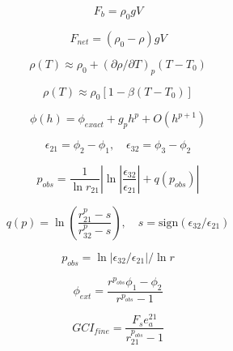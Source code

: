 
\[
F_b=\rho_0 gV
\]

\[
F_{net}=(\rho_0-\rho)gV
\]

\[
\rho(T)\approx\rho_0+(\partial\rho/\partial T)_p(T-T_0)
\]

\[
\rho(T)\approx\rho_0[1-\beta(T-T_0)]
\]

\[
\phi(h)=\phi_{exact}+g_p h^p+O(h^{p+1})
\]

\[
\epsilon_{21}=\phi_2-\phi_1,\quad\epsilon_{32}=\phi_3-\phi_2
\]

\[
p_{obs}=\frac{1}{\ln r_{21}}\left\lvert\ln\left\lvert\frac{\epsilon_{32}}{\epsilon_{21}}\right\rvert+q(p_{obs})\right\rvert
\]

\[
q(p)=\ln\left(\frac{r_{21}^{p}-s}{r_{32}^{p}-s}\right),\quad s=\mathrm{sign}(\epsilon_{32}/\epsilon_{21})
\]

\[
p_{obs}=\ln\left\lvert\epsilon_{32}/\epsilon_{21}\right\rvert/\ln r
\]

\[
\phi_{ext}=\frac{r^{p_{obs}}\phi_1-\phi_2}{r^{p_{obs}}-1}
\]

\[
GCI_{fine}=\frac{F_s e_a^{21}}{r_{21}^{p_{obs}}-1}
\]

